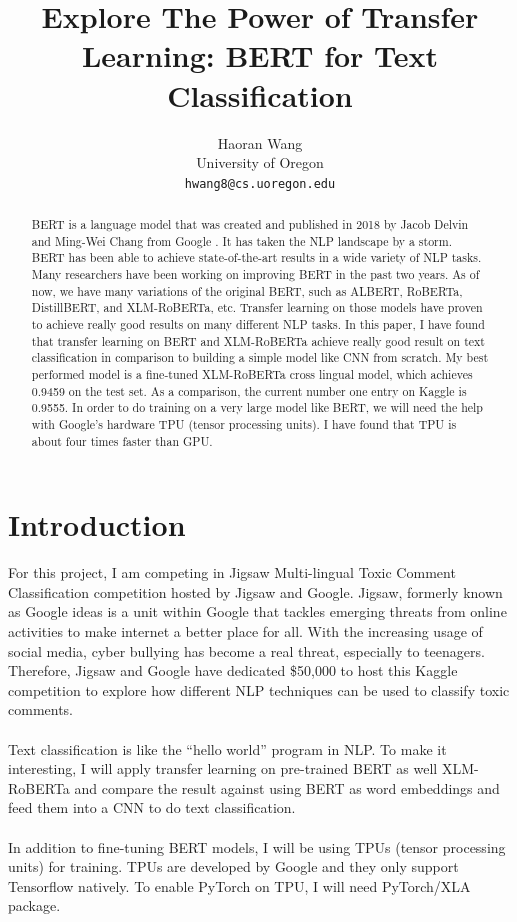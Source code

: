 \documentclass[11pt,a4paper]{article}
\title{Explore The Power of Transfer Learning: BERT for Text Classification}
\author{Haoran Wang \\
  University of Oregon \\
  {\tt hwang8@cs.uoregon.edu} }
\date{}
\begin{document}
\maketitle
\begin{abstract}
BERT is a language model that was created and published in 2018 by Jacob Delvin and Ming-Wei Chang from Google \cite{BERT}. It has taken the NLP landscape by a storm. BERT has been able to achieve state-of-the-art results in a wide variety of NLP tasks. Many researchers have been working on improving BERT in the past two years. As of now, we have  many variations of the original BERT, such as ALBERT, RoBERTa, DistillBERT, and XLM-RoBERTa, etc. Transfer learning on those models have proven to achieve really good results on many different NLP tasks. In this paper, I have found that transfer learning on BERT and XLM-RoBERTa achieve really good result on text classification in comparison to building a simple model like CNN from scratch. My best performed model is a fine-tuned XLM-RoBERTa cross lingual model, which achieves 0.9459 on the test set. As a comparison, the current number one entry on Kaggle is 0.9555.  In order to do training on a very large model like BERT, we will need the help with Google's hardware TPU (tensor processing units). I have found that TPU is about four times faster than GPU. 
\end{abstract}

\section{Introduction}

For this project, I am competing in Jigsaw Multi-lingual Toxic Comment Classification competition hosted by Jigsaw and Google. Jigsaw, formerly known as Google ideas is a unit within Google that tackles emerging threats from online activities to make internet a better place for all. With the increasing usage of social media, cyber bullying has become a real threat, especially to teenagers. Therefore, Jigsaw and Google have dedicated \$50,000 to host this Kaggle competition to explore how different NLP techniques can be used to classify toxic comments.\\
\\
Text classification is like the “hello world” program in NLP. To make it interesting, I will apply transfer learning on pre-trained BERT as well XLM-RoBERTa and compare the result against using BERT as word embeddings and feed them into a CNN to do text classification.\\
\\
In addition to fine-tuning BERT models, I will be using TPUs (tensor processing units) for training. TPUs are developed by Google and they only support Tensorflow natively. To enable PyTorch on TPU, I will need PyTorch/XLA package.
\end{document}
